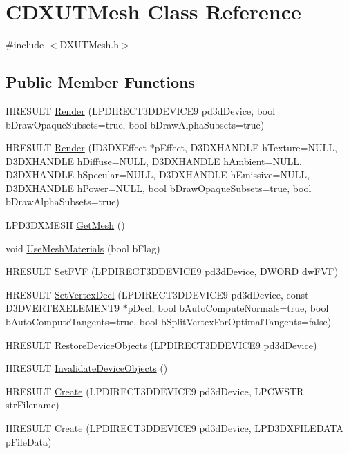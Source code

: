 \hypertarget{class_c_d_x_u_t_mesh}{
\section{CDXUTMesh Class Reference}
\label{class_c_d_x_u_t_mesh}
}


{\ttfamily \#include $<$DXUTMesh.h$>$}\subsection*{Public Member Functions}
\begin{DoxyCompactItemize}
\item 
HRESULT \hyperlink{class_c_d_x_u_t_mesh_a55ce28dfc8c207496925bf757819b4dd}{Render} (LPDIRECT3DDEVICE9 pd3dDevice, bool bDrawOpaqueSubsets=true, bool bDrawAlphaSubsets=true)
\item 
HRESULT \hyperlink{class_c_d_x_u_t_mesh_a49f40ac0f3c696648d1624031de6e69e}{Render} (ID3DXEffect $\ast$pEffect, D3DXHANDLE hTexture=NULL, D3DXHANDLE hDiffuse=NULL, D3DXHANDLE hAmbient=NULL, D3DXHANDLE hSpecular=NULL, D3DXHANDLE hEmissive=NULL, D3DXHANDLE hPower=NULL, bool bDrawOpaqueSubsets=true, bool bDrawAlphaSubsets=true)
\item 
LPD3DXMESH \hyperlink{class_c_d_x_u_t_mesh_af6138b3d68265bce510ec4bf958c8d55}{GetMesh} ()
\item 
void \hyperlink{class_c_d_x_u_t_mesh_ab5b2b54044783960656a44b5706300f8}{UseMeshMaterials} (bool bFlag)
\item 
HRESULT \hyperlink{class_c_d_x_u_t_mesh_a1b5df189a3d243da983d4afa2636068b}{SetFVF} (LPDIRECT3DDEVICE9 pd3dDevice, DWORD dwFVF)
\item 
HRESULT \hyperlink{class_c_d_x_u_t_mesh_a49ef2ffb882b26cae6925f0c539dd804}{SetVertexDecl} (LPDIRECT3DDEVICE9 pd3dDevice, const D3DVERTEXELEMENT9 $\ast$pDecl, bool bAutoComputeNormals=true, bool bAutoComputeTangents=true, bool bSplitVertexForOptimalTangents=false)
\item 
HRESULT \hyperlink{class_c_d_x_u_t_mesh_a76933c7491aa30b0b96cdb6b336987a1}{RestoreDeviceObjects} (LPDIRECT3DDEVICE9 pd3dDevice)
\item 
HRESULT \hyperlink{class_c_d_x_u_t_mesh_a1ffb2e6d24e4bc0dfc053e15c4264eac}{InvalidateDeviceObjects} ()
\item 
HRESULT \hyperlink{class_c_d_x_u_t_mesh_ad615a48d94e00ac0b84748218dee4182}{Create} (LPDIRECT3DDEVICE9 pd3dDevice, LPCWSTR strFilename)
\item 
HRESULT \hyperlink{class_c_d_x_u_t_mesh_ae29182e3156de207f02c10f6517fc525}{Create} (LPDIRECT3DDEVICE9 pd3dDevice, LPD3DXFILEDATA pFileData)

\end{DoxyCompactItemize}

